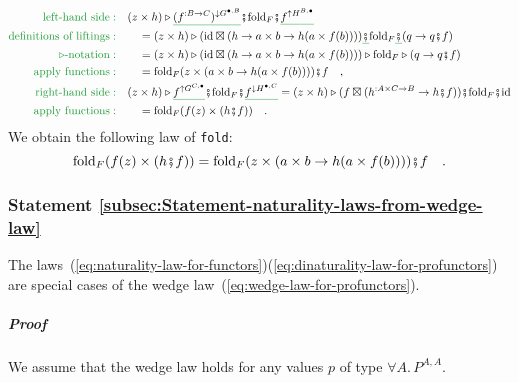 \begin{align*}
{\color{greenunder}\text{left-hand side}:}\quad & (z\times h)\triangleright\gunderline{(f^{:B\rightarrow C})^{\downarrow G^{\bullet,B}}}\bef\text{fold}_{F}\bef\gunderline{f^{\uparrow H^{B,\bullet}}}\\
{\color{greenunder}\text{definitions of liftings}:}\quad & \quad=(z\times h)\triangleright(\text{id}\boxtimes(h\rightarrow a\times b\rightarrow h(a\times f(b))))\gunderline{\bef}\text{fold}_{F}\gunderline{\bef}(q\rightarrow q\bef f)\\
{\color{greenunder}\triangleright\text{-notation}:}\quad & \quad=(z\times h)\triangleright(\text{id}\boxtimes(h\rightarrow a\times b\rightarrow h(a\times f(b))))\triangleright\text{fold}_{F}\triangleright(q\rightarrow q\bef f)\\
{\color{greenunder}\text{apply functions}:}\quad & \quad=\text{fold}_{F}(z\times(a\times b\rightarrow h(a\times f(b))))\bef f\quad,\\
{\color{greenunder}\text{right-hand side}:}\quad & (z\times h)\triangleright\gunderline{f^{\uparrow G^{C,\bullet}}}\bef\text{fold}_{F}\bef\gunderline{f^{\downarrow H^{\bullet,C}}}=(z\times h)\triangleright(f\boxtimes(h^{:A\times C\rightarrow B}\rightarrow h\bef f))\bef\text{fold}_{F}\bef\text{id}\\
{\color{greenunder}\text{apply functions}:}\quad & \quad=\text{fold}_{F}(f(z)\times(h\bef f))\quad.
\end{align*}
We obtain the following law of \lstinline!fold!:
\[
\text{fold}_{F}(f(z)\times(h\bef f))=\text{fold}_{F}(z\times(a\times b\rightarrow h(a\times f(b))))\bef f\quad.
\]


\subsubsection{Statement \label{subsec:Statement-naturality-laws-from-wedge-law}\ref{subsec:Statement-naturality-laws-from-wedge-law}}

The laws~(\ref{eq:naturality-law-for-functors})\textendash (\ref{eq:dinaturality-law-for-profunctors})
are special cases of the wedge law~(\ref{eq:wedge-law-for-profunctors}). 

\subparagraph{Proof}

We assume that the wedge law holds for any values $p$ of type $\forall A.\,P^{A,A}$.

